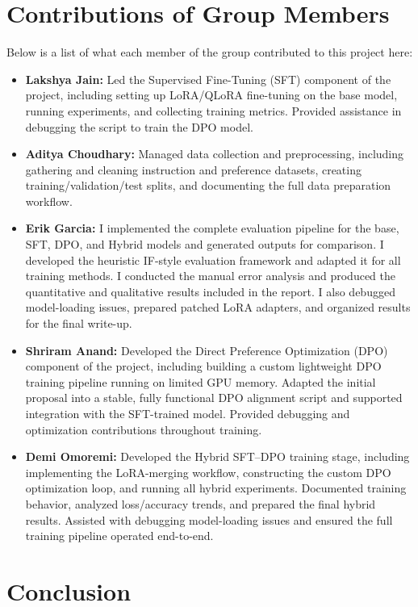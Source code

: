 \documentclass[11pt,a4paper]{article}
\begin{document}
\section{Contributions of Group Members}
Below is a list of what each member of the group contributed to this project here: 
\begin{itemize}
    \item{\textbf{Lakshya Jain:} Led the Supervised Fine-Tuning (SFT) component of the project, including setting up LoRA/QLoRA fine-tuning on the base model, running experiments, and collecting training metrics. Provided assistance in debugging the script to train the DPO model.}
    \item{\textbf{Aditya Choudhary:} Managed data collection and preprocessing, including gathering and cleaning instruction and preference datasets, creating training/validation/test splits, and documenting the full data preparation workflow.}
    \item{\textbf{Erik Garcia:} I implemented the complete evaluation pipeline for the base, SFT, DPO, and Hybrid models and generated outputs for comparison. I developed the heuristic IF-style evaluation framework and adapted it for all training methods. I conducted the manual error analysis and produced the quantitative and qualitative results included in the report. I also debugged model-loading issues, prepared patched LoRA adapters, and organized results for the final write-up.}
    \item{\textbf{Shriram Anand:} Developed the Direct Preference Optimization (DPO) component of the project, including building a custom lightweight DPO training pipeline running on limited GPU memory. Adapted the initial proposal into a stable, fully functional DPO alignment script and supported integration with the SFT-trained model. Provided debugging and optimization contributions throughout training.}
    \item{\textbf{Demi Omoremi:} Developed the Hybrid SFT–DPO training stage, including implementing the LoRA-merging workflow, constructing the custom DPO optimization loop, and running all hybrid experiments. Documented training behavior, analyzed loss/accuracy trends, and prepared the final hybrid results. Assisted with debugging model-loading issues and ensured the full training pipeline operated end-to-end.}
\end{itemize}

\section{Conclusion}
\end{document}
